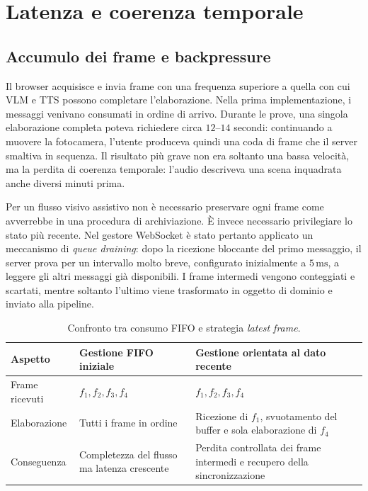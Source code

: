 \section{Latenza e coerenza temporale}
\label{sec:problemi-latenza}

\subsection{Accumulo dei frame e backpressure}
\label{subsec:problemi-queue-draining}

Il browser acquisisce e invia frame con una frequenza superiore a quella con
cui VLM e TTS possono completare l'elaborazione. Nella prima implementazione,
i messaggi venivano consumati in ordine di arrivo. Durante le prove, una
singola elaborazione completa poteva richiedere circa \(12\)--\(14\) secondi:
continuando a muovere la fotocamera, l'utente produceva quindi una coda di
frame che il server smaltiva in sequenza. Il risultato più grave non era
soltanto una bassa velocità, ma la perdita di coerenza temporale: l'audio
descriveva una scena inquadrata anche diversi minuti prima.

Per un flusso visivo assistivo non è necessario preservare ogni frame come
avverrebbe in una procedura di archiviazione. È invece necessario privilegiare
lo stato più recente. Nel gestore WebSocket è stato pertanto applicato un
meccanismo di \emph{queue draining}: dopo la ricezione bloccante del primo
messaggio, il server prova per un intervallo molto breve, configurato
inizialmente a \(5\,\mathrm{ms}\), a leggere gli altri messaggi già
disponibili. I frame intermedi vengono conteggiati e scartati, mentre soltanto
l'ultimo viene trasformato in oggetto di dominio e inviato alla pipeline.

\begin{table}[H]
    \centering
    \begingroup
    \small
    \renewcommand{\arraystretch}{1.28}
    \setlength{\tabcolsep}{4pt}
    \begin{tabular}{|
        p{}|
        p{}|
        p{}|
    }
        \hline
        \rowcolor{SlateGray!18}
        \textbf{Aspetto} & \textbf{Gestione FIFO iniziale} &
        \textbf{Gestione orientata al dato recente} \\
        \hline
        \rowcolor{AliceBlue!32}
        Frame ricevuti &
        \(f_1, f_2, f_3, f_4\) &
        \(f_1, f_2, f_3, f_4\) \\
        \hline
        Elaborazione &
        Tutti i frame in ordine &
        Ricezione di \(f_1\), svuotamento del buffer e sola elaborazione di
        \(f_4\) \\
        \hline
        \rowcolor{AliceBlue!32}
        Conseguenza &
        Completezza del flusso ma latenza crescente &
        Perdita controllata dei frame intermedi e recupero della sincronizzazione \\
        \hline
    \end{tabular}
    \endgroup
    \caption{Confronto tra consumo FIFO e strategia \emph{latest frame}.}
    \label{tab:queue-draining}
\end{table}


